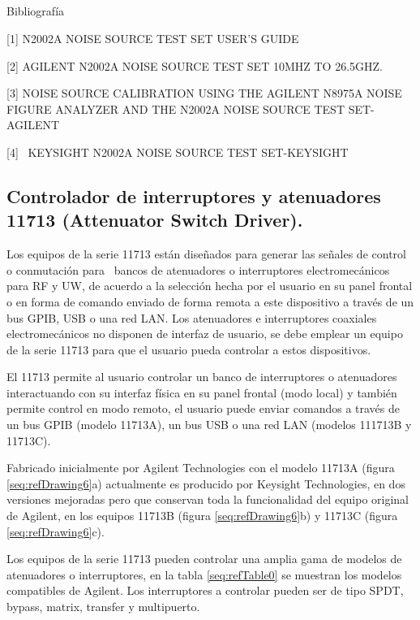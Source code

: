 \documentclass[paper=letter,oneside,fontsize=10pt,parskip=full]{article}
\newcounter{Table}
\newcounter{Drawing}
\begin{document}
\subsection{}

\bigskip

Bibliografía

[1] N2002A NOISE SOURCE TEST SET USER'S GUIDE

[2] AGILENT N2002A NOISE SOURCE TEST SET 10MHZ TO 26.5GHZ.

[3] NOISE SOURCE CALIBRATION USING THE AGILENT N8975A NOISE FIGURE ANALYZER AND THE N2002A NOISE SOURCE TEST SET-AGILENT

[4] \ KEYSIGHT N2002A NOISE SOURCE TEST SET-KEYSIGHT


\bigskip

\subsection[Controlador de interruptores y atenuadores 11713 (Attenuator Switch Driver).]{Controlador de interruptores y
atenuadores 11713 (Attenuator Switch Driver).}
Los equipos de la serie 11713 están diseñados para generar las señales de control o conmutación para \ bancos de
atenuadores o interruptores electromecánicos para RF y UW, de acuerdo a la selección hecha por el usuario en su panel
frontal o en forma de comando enviado de forma remota a este dispositivo a través de un bus GPIB, USB o una red LAN.
Los atenuadores e interruptores coaxiales electromecánicos no disponen de interfaz de usuario, se debe emplear un
equipo de la serie 11713 para que el usuario pueda controlar a estos dispositivos.

El 11713 permite al usuario controlar un banco de interruptores o atenuadores interactuando con su interfaz física en su
panel frontal (modo local) y también permite control en modo remoto, el usuario puede enviar comandos a través de un
bus GPIB (modelo 11713A), un bus USB o una red LAN (modelos 111713B y 11713C).

Fabricado inicialmente por Agilent Technologies con el modelo 11713A (figura \ref{seq:refDrawing6}a) actualmente es
producido por Keysight Technologies, en dos versiones mejoradas pero que conservan toda la funcionalidad del equipo
original de Agilent, en los equipos 11713B (figura \ref{seq:refDrawing6}b) y 11713C (figura \ref{seq:refDrawing6}c).

Los equipos de la serie 11713 pueden controlar una amplia gama de modelos de atenuadores o interruptores, en la tabla
\ref{seq:refTable0} se muestran los modelos compatibles de Agilent. Los interruptores a controlar pueden ser de tipo
SPDT, bypass, matrix, transfer y multipuerto.
\end{document}
